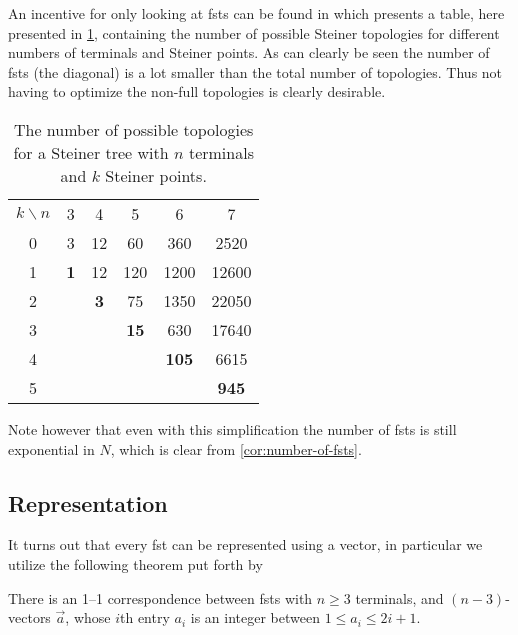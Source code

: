 An incentive for only looking at \acp{fst} can be found in \textcite{gilbert1968}
which presents a table, here presented in \cref{tab:number-of-topologies},
containing the number of possible Steiner topologies for different numbers of
terminals and Steiner points. As can clearly be seen the number of \acp{fst}
(the diagonal) is a lot smaller than the total number of topologies. Thus not
having to optimize the non-full topologies is clearly desirable.

\begin{table}[htbp]
  \centering
  \begin{tabular}{cccccc}
    \toprule
    $k \backslash n$ & 3    & 4    & 5     & 6      & 7      \\
    \hhline{~-----}
    0   & 3          & 12         & 60          & 360          & 2520         \\
    1   & \textbf{1} & 12         & 120         & 1200         & 12600        \\
    2   &            & \textbf{3} & 75          & 1350         & 22050        \\
    3   &            &            & \textbf{15} & 630          & 17640        \\
    4   &            &            &             & \textbf{105} & 6615         \\
    5   &            &            &             &              & \textbf{945} \\
    \bottomrule
  \end{tabular}
  \caption[Number of possible topologies]{The number of possible topologies for a Steiner tree with $n$
    terminals and $k$ Steiner points.\label{tab:number-of-topologies}}
\end{table}

Note however that even with this simplification the number of \acp{fst} is
still exponential in $N$, which is clear from \cref{cor:number-of-fsts}.

\subsection{Representation}
\label{sec:representation}

It turns out that every \ac{fst} can be represented using a vector, in
particular we utilize the following theorem put forth by \textcite{smith1992}

\begin{theorem}
  There is an 1--1 correspondence between \acp{fst} with $n \ge 3$ terminals,
  and $(n-3)$-vectors $\vec{a}$, whose $i$th entry $a_i$ is an integer between
  $1 \le a_i \le 2 i + 1$.
\end{theorem}

